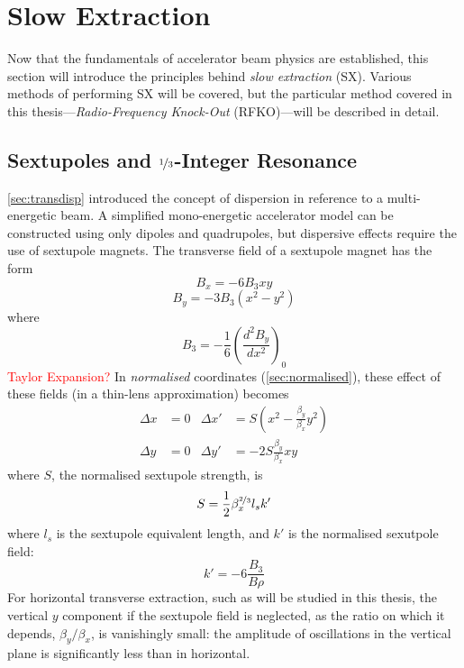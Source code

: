 \documentclass[11pt]{report}
\newcommand\todo[1]{\textcolor{red}{#1}}
\begin{document}
\section{Slow Extraction}\label{sx}
Now that the fundamentals of accelerator beam physics are established, this section will introduce the principles behind \textit{slow extraction} (SX). Various methods of performing SX will be covered, but the particular method covered in this thesis---\textit{Radio-Frequency Knock-Out} (RFKO)---will be described in detail.

\subsection{Sextupoles and $\nicefrac 13$-Integer Resonance}

\autoref{sec:transdisp} introduced the concept of dispersion in reference to a multi-energetic beam. A simplified mono-energetic accelerator model can be constructed using only dipoles and quadrupoles, but dispersive effects require the use of sextupole magnets. The transverse field of a sextupole magnet has the form
\begin{equation}
  B_x = -6B_3xy
\end{equation}
\begin{equation}
  B_y = -3B_3(x^2-y^2)
\end{equation} where
\begin{equation}
  B_3=-\frac 16\left(\frac{d^2B_y}{dx^2}\right)_0
\end{equation}
\todo{Taylor Expansion?}
In \textit{normalised} coordinates (\autoref{sec:normalised}), these effect of these fields (in a thin-lens approximation) becomes
\begin{align*}
  \Delta x&=0 & \Delta x'&=S(x^2-\frac{\beta_y}{\beta_x}y^2) \\
  \Delta y&=0 & \Delta y'&=-2S\frac{\beta_y}{\beta_x}xy
\end{align*}
where $S$, the normalised sextupole strength, is
\begin{equation}
  S=\frac 12\beta_x^{\nicefrac 23}l_sk'
  \label{eq:normalised_sextupole_strength}
\end{equation} where $l_s$ is the sextupole equivalent length, and $k'$ is the normalised sexutpole field:
\begin{equation}
  k'=-6\frac{B_3}{B\rho}
\end{equation}
For horizontal transverse extraction, such as will be studied in this thesis, the vertical $y$ component if the sextupole field is neglected, as the ratio on which it depends,  $\beta_y/\beta_x$, is vanishingly small: the amplitude of oscillations in the vertical plane is significantly less than in horizontal.
\end{document}
